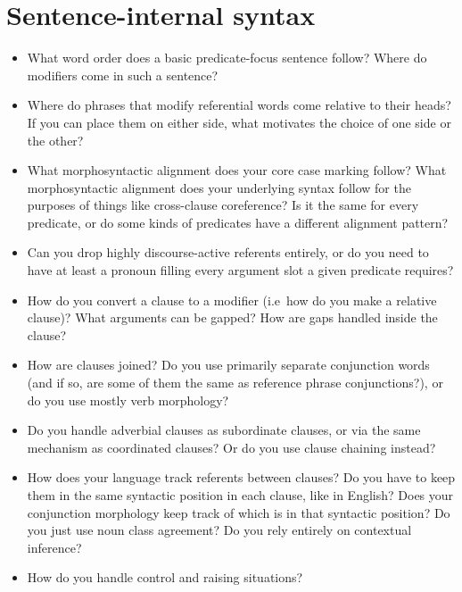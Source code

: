 \documentclass{article}
\begin{document}
\section{Sentence-internal syntax}
\begin{itemize}
  \item What word order does a basic predicate-focus sentence follow? Where do modifiers come in such a sentence?
  \item Where do phrases that modify referential words come relative to their heads? If you can place them on either side, what motivates the choice of one side or the other?
  \item What morphosyntactic alignment does your core case marking follow? What morphosyntactic alignment does your underlying syntax follow for the purposes of things like cross-clause coreference? Is it the same for every predicate, or do some kinds of predicates have a different alignment pattern?
  \item Can you drop highly discourse-active referents entirely, or do you need to have at least a pronoun filling every argument slot a given predicate requires?
  \item How do you convert a clause to a modifier (i.e\ how do you make a relative clause)? What arguments can be gapped? How are gaps handled inside the clause?
  \item How are clauses joined? Do you use primarily separate conjunction words (and if so, are some of them the same as reference phrase conjunctions?), or do you use mostly verb morphology?
  \item Do you handle adverbial clauses as subordinate clauses, or via the same mechanism as coordinated clauses? Or do you use clause chaining instead?
  \item How does your language track referents between clauses? Do you have to keep them in the same syntactic position in each clause, like in English? Does your conjunction morphology keep track of which is in that syntactic position? Do you just use noun class agreement? Do you rely entirely on contextual inference?
  \item How do you handle control and raising situations?%
\end{itemize}
\end{document}
